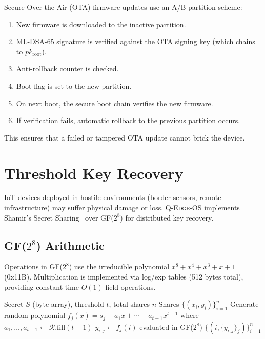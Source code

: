 \documentclass[conference,10pt]{IEEEtran}
\newcommand{\system}{\textsc{Q-Edge-OS}}
\begin{document}
Secure Over-the-Air (OTA) firmware updates use an A/B partition scheme:

\begin{enumerate}[leftmargin=*]
  \item New firmware is downloaded to the inactive partition.
  \item ML-DSA-65 signature is verified against the OTA signing key (which chains to $pk_{\text{root}}$).
  \item Anti-rollback counter is checked.
  \item Boot flag is set to the new partition.
  \item On next boot, the secure boot chain verifies the new firmware.
  \item If verification fails, automatic rollback to the previous partition occurs.
\end{enumerate}

This ensures that a failed or tampered OTA update cannot brick the device.

\section{Threshold Key Recovery}
\label{sec:recovery}

IoT devices deployed in hostile environments (border sensors, remote infrastructure) may suffer physical damage or loss. \system{} implements Shamir's Secret Sharing~\cite{shamir1979} over GF($2^8$) for distributed key recovery.

\subsection{GF($2^8$) Arithmetic}

Operations in GF($2^8$) use the irreducible polynomial $x^8 + x^4 + x^3 + x + 1$ (0x11B). Multiplication is implemented via log/exp tables (512 bytes total), providing constant-time $O(1)$ field operations.

\begin{algorithm}[t]
\caption{Shamir Secret Sharing -- Split}
\label{alg:shamir_split}
\begin{algorithmic}[1]
\REQUIRE Secret $S$ (byte array), threshold $t$, total shares $n$
\ENSURE Shares $\{(x_i, y_i)\}_{i=1}^{n}$
  \STATE Generate random polynomial $f_j(x) = s_j + a_1 x + \cdots + a_{t-1} x^{t-1}$
  \STATE where $a_1, \ldots, a_{t-1} \gets \mathcal{R}.\text{fill}(t-1)$
    \STATE $y_{i,j} \gets f_j(i)$ evaluated in GF($2^8$)
  \ENDFOR
\ENDFOR
\RETURN $\{(i, \{y_{i,j}\}_j)\}_{i=1}^{n}$
\end{algorithmic}
\end{algorithm}
\end{document}
